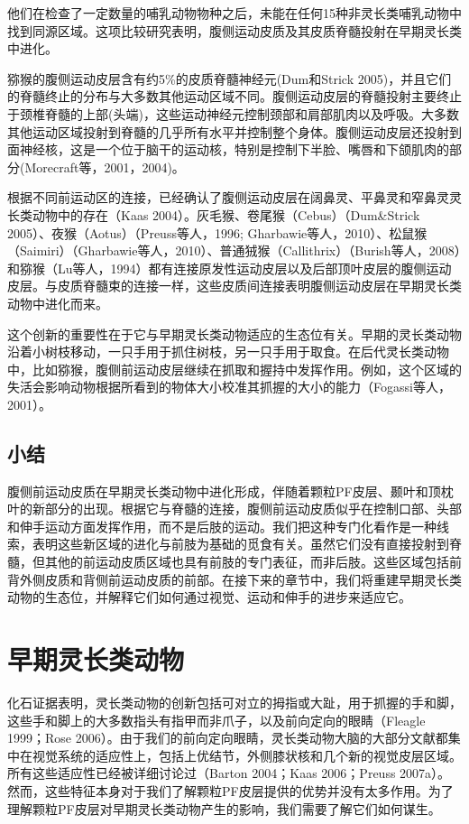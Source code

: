 他们在检查了一定数量的哺乳动物物种之后，未能在任何15种非灵长类哺乳动物中找到同源区域。这项比较研究表明，腹侧运动皮质及其皮质脊髓投射在早期灵长类中进化。

猕猴的腹侧运动皮层含有约5\%的皮质脊髓神经元(Dum和Strick 2005)，并且它们的脊髓终止的分布与大多数其他运动区域不同。腹侧运动皮层的脊髓投射主要终止于颈椎脊髓的上部(头端)，这些运动神经元控制颈部和肩部肌肉以及呼吸。大多数其他运动区域投射到脊髓的几乎所有水平并控制整个身体。腹侧运动皮层还投射到面神经核，这是一个位于脑干的运动核，特别是控制下半脸、嘴唇和下颌肌肉的部分(Morecraft等，2001，2004)。

根据不同前运动区的连接，已经确认了腹侧运动皮层在阔鼻灵、平鼻灵和窄鼻灵灵长类动物中的存在（Kaas 2004）。灰毛猴、卷尾猴（Cebus）（Dum\&Strick 2005）、夜猴（Aotus）（Preuss等人，1996; Gharbawie等人，2010）、松鼠猴（Saimiri）（Gharbawie等人，2010）、普通狨猴（Callithrix）（Burish等人，2008）和猕猴（Lu等人，1994）都有连接原发性运动皮层以及后部顶叶皮层的腹侧运动皮层。与皮质脊髓束的连接一样，这些皮质间连接表明腹侧运动皮层在早期灵长类动物中进化而来。

这个创新的重要性在于它与早期灵长类动物适应的生态位有关。早期的灵长类动物沿着小树枝移动，一只手用于抓住树枝，另一只手用于取食。在后代灵长类动物中，比如猕猴，腹侧前运动皮层继续在抓取和握持中发挥作用。例如，这个区域的失活会影响动物根据所看到的物体大小校准其抓握的大小的能力（Fogassi等人，2001）。

\subsection{小结}
腹侧前运动皮质在早期灵长类动物中进化形成，伴随着颗粒PF皮层、颞叶和顶枕叶的新部分的出现。根据它与脊髓的连接，腹侧前运动皮质似乎在控制口部、头部和伸手运动方面发挥作用，而不是后肢的运动。我们把这种专门化看作是一种线索，表明这些新区域的进化与前肢为基础的觅食有关。虽然它们没有直接投射到脊髓，但其他的前运动皮质区域也具有前肢的专门表征，而非后肢。这些区域包括前背外侧皮质和背侧前运动皮质的前部。在接下来的章节中，我们将重建早期灵长类动物的生态位，并解释它们如何通过视觉、运动和伸手的进步来适应它。

\section{早期灵长类动物}
化石证据表明，灵长类动物的创新包括可对立的拇指或大趾，用于抓握的手和脚，这些手和脚上的大多数指头有指甲而非爪子，以及前向定向的眼睛（Fleagle 1999；Rose 2006）。由于我们的前向定向眼睛，灵长类动物大脑的大部分文献都集中在视觉系统的适应性上，包括上优结节，外侧膝状核和几个新的视觉皮层区域。所有这些适应性已经被详细讨论过（Barton 2004；Kaas 2006；Preuss 2007a）。然而，这些特征本身对于我们了解颗粒PF皮层提供的优势并没有太多作用。为了理解颗粒PF皮层对早期灵长类动物产生的影响，我们需要了解它们如何谋生。

